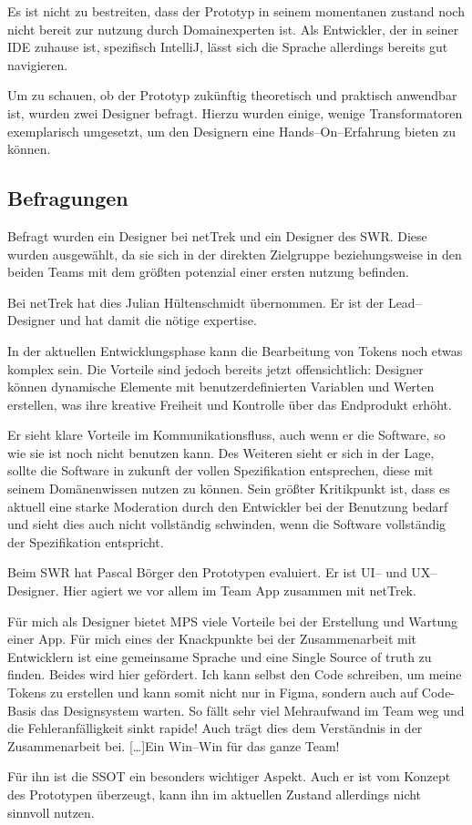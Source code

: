 Es ist nicht zu bestreiten, dass der Prototyp in seinem momentanen zustand noch nicht bereit zur nutzung durch Domainexperten ist.
Als Entwickler, der in seiner \ac{IDE} zuhause ist, spezifisch IntelliJ, lässt sich die Sprache allerdings bereits gut navigieren.

Um zu schauen, ob der Prototyp zukünftig theoretisch und praktisch anwendbar ist, wurden zwei Designer befragt.
Hierzu wurden einige, wenige Transformatoren exemplarisch umgesetzt, um den Designern eine Hands--On--Erfahrung bieten zu können.

\subsection{Befragungen}\label{subsec:befragungen}
Befragt wurden ein Designer bei \ac{netTrek} und ein Designer des \ac{SWR}.
Diese wurden ausgewählt, da sie sich in der direkten Zielgruppe beziehungsweise in den beiden Teams mit dem größten potenzial einer ersten nutzung befinden.

Bei \ac{netTrek} hat dies Julian Hültenschmidt übernommen.
Er ist der Lead--Designer und hat damit die nötige expertise.
\begin{displayquote}
    In der aktuellen Entwicklungsphase kann die Bearbeitung von Tokens noch etwas komplex sein.
    Die Vorteile sind jedoch bereits jetzt offensichtlich: Designer können dynamische Elemente mit benutzerdefinierten Variablen und Werten erstellen, was ihre kreative Freiheit und Kontrolle über das Endprodukt erhöht.
\end{displayquote}
Er sieht klare Vorteile im Kommunikationsfluss, auch wenn er die Software, so wie sie ist noch nicht benutzen kann.
Des Weiteren sieht er sich in der Lage, sollte die Software in zukunft der vollen Spezifikation entsprechen, diese mit seinem Domänenwissen nutzen zu können.
Sein größter Kritikpunkt ist, dass es aktuell eine starke Moderation durch den Entwickler bei der Benutzung bedarf und sieht dies auch nicht vollständig schwinden, wenn die Software vollständig der Spezifikation entspricht.

Beim \ac{SWR} hat Pascal Börger den Prototypen evaluiert.
Er ist \acs{UI}-- und \acs{UX}--Designer.
Hier agiert we vor allem im Team App zusammen mit \ac{netTrek}.
\begin{displayquote}
    Für mich als Designer bietet MPS viele Vorteile bei der Erstellung und Wartung einer App.
    Für mich eines der Knackpunkte bei der Zusammenarbeit mit Entwicklern ist eine gemeinsame Sprache und eine Single Source of truth zu finden.
    Beides wird hier gefördert.
    Ich kann selbst den Code schreiben, um meine Tokens zu erstellen und kann somit nicht nur in Figma, sondern auch auf Code-Basis das Designsystem warten.
    So fällt sehr viel Mehraufwand im Team weg und die Fehleranfälligkeit sinkt rapide!
    Auch trägt dies dem Verständnis in der Zusammenarbeit bei.
    [\ldots]\@ Ein Win--Win für das ganze Team!
\end{displayquote}
Für ihn ist die \ac{SSOT} ein besonders wichtiger Aspekt.
Auch er ist vom Konzept des Prototypen überzeugt, kann ihn im aktuellen Zustand allerdings nicht sinnvoll nutzen.

